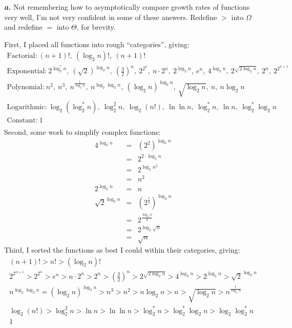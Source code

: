 \noindent\textbf{\textit{a.}} Not remembering how to asymptotically compare growth rates of functions very well, I'm not very confident in some of these answers. Redefine $>$ into $\Omega$ and redefine $=$ into $\Theta$, for brevity.

First, I placed all functions into rough ``categories'', giving:
\begin{multline}
	\text{Factorial:} ~ (n+1)! ,~ (\log_2 n)! ,~ (n+1)! \\
	\text{Exponential:} ~ 2^{\log_2^* n} ,~ (\sqrt{2})^{\log_2 n} ,~ \left(\frac{3}{2}\right)^n ,~ 2^{2^n} ,~ n \cdot 2^n ,~ 2^{\log_2 n} ,~ e^n ,~ 4^{\log_2 n} ,~ 2^{\sqrt{2 \log_2 n}} ,~ 2^n ,~ 2^{2^{n+1}} \\
	\text{Polynomial:} ~ n^2 ,~ n^3 ,~ n^{\frac{1}{\log_2 n}} ,~ n^{\log_2 \log_2 n} ,~ \left(\log_2 n\right)^{\log_2 n} ,~ \sqrt{\log_2 n} ,~ n ,~ n \log_2 n \\
	\text{Logarithmic:} ~ \log_2 \left(\log^*_2 n\right) ,~ \log^2_2 n ,~ \log_2 (n!) ,~ \ln \ln n ,~ \log^*_2 n ,~ \ln n ,~ \log^*_2 \log_2 n \\
	\text{Constant:} ~ 1 \\
\end{multline}
Second, some work to simplify complex functions:
\begin{eqnarray*}
	4^{\log_2 n} & = & (2^2)^{\log_2 n} \\
	& = & 2^{2 \cdot \log_2 n} \\
	& = & 2^{\log_2 n^2} \\
	& = & n^2 \\
	2^{\log_2 n} & = & n \\
	\sqrt{2}^{\log_2 n} & = & \left(2^{\frac{1}{2}}\right)^{\log_2 n} \\
	& = & 2^{\frac{\log_2 n}{2}} \\
	& = & 2^{\log_2 \sqrt{n}} \\
	& = & \sqrt{n}
\end{eqnarray*}
Third, I sorted the functions as best I could within their categories, giving:
\begin{multline}
	(n+1)! > n! > (\log_2 n)! \\
	2^{2^{n+1}} > 2^{2^n} > e^n > n \cdot 2^n > 2^n > \left(\frac{3}{2}\right)^n > 2^{\sqrt{2 \log_2 n}} > 4^{\log_2 n} > 2^{\log_2 n} > \sqrt{2}^{\log_2 n} \\
	n^{\log_2 \log_2 n} = (\log_2 n)^{\log_2 n} > n^3 > n^2 > n \log_2 n > n > \sqrt{\log_2 n} > n^{\frac{1}{\log_2 n}} \\
	\log_2 (n!) > \log^2_2 n > \ln n > \ln \ln n > \log^*_2 n > \log^*_2 \log_2 n > \log_2 \log^*_2 n \\
	1 \\
\end{multline}
